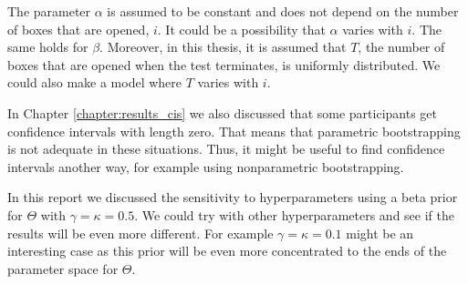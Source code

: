 The parameter $\alpha$ is assumed to be constant and does not depend on the number of boxes that are opened, $i$. It could be a possibility that $\alpha$ varies with $i$. The same holds for $\beta$. Moreover, in this thesis, it is assumed that $T$, the number of boxes that are opened when the test terminates, is uniformly distributed. We could also make a model where $T$ varies with $i$. 

In Chapter \ref{chapter:results_cis} we also discussed that some participants get confidence intervals with length zero. That means that parametric bootstrapping is not adequate in these situations. Thus, it might be useful to find confidence intervals another way, for example using nonparametric bootstrapping. 

In this report we discussed the sensitivity to hyperparameters using a beta prior for $\Theta$ with $\gamma=\kappa=0.5$. We could try with other hyperparameters and see if the results will be even more different. For example $\gamma=\kappa=0.1$ might be an interesting case as this prior will be even more concentrated to the ends of the parameter space for $\Theta$. 


